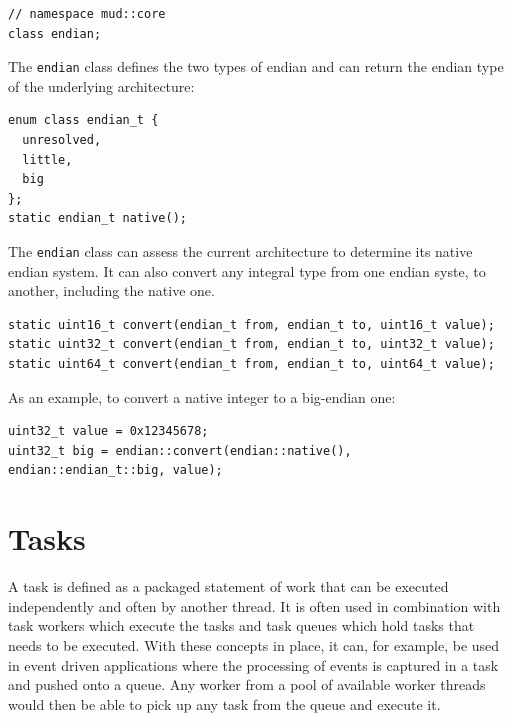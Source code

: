 \documentclass[10pt,a4paper,openany]{mudbook}
\begin{document}
\begin{lstlisting}[style=definition]
// namespace mud::core
class endian;
\end{lstlisting}

The \texttt{endian} class defines the two types of endian and can return the
endian type of the underlying architecture:

\begin{lstlisting}[style=definition]
enum class endian_t {
  unresolved,
  little,
  big
};
static endian_t native();
\end{lstlisting}
  
The \texttt{endian} class can assess the current architecture to determine
its native endian system. It can also convert any integral type from one
endian syste, to another, including the native one.

\begin{lstlisting}[style=definition]
static uint16_t convert(endian_t from, endian_t to, uint16_t value);
static uint32_t convert(endian_t from, endian_t to, uint32_t value);
static uint64_t convert(endian_t from, endian_t to, uint64_t value);
\end{lstlisting}

As an example, to convert a native integer to a big-endian one:

\begin{lstlisting}[style=snippet]
uint32_t value = 0x12345678;
uint32_t big = endian::convert(endian::native(), endian::endian_t::big, value);
\end{lstlisting}


\chapter{Tasks}
\label{chp:tasks}

A task is defined as a packaged statement of work that can be executed 
independently and often by another thread. It is often used in combination with
task workers which execute the tasks and task queues which hold tasks that
needs to be executed. With these concepts in place, it can, for example, be
used in event driven applications where the processing of events is captured
in a task and pushed onto a queue. Any worker from a pool of available worker
threads would then be able to pick up any task from the queue and execute it.
\end{document}

